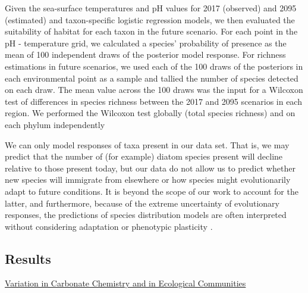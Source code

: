 \documentclass[11pt]{article}
\begin{document}
\begin{linenumbers}
Given the sea-surface temperatures and pH values for 2017 (observed) and 2095 (estimated) and taxon-specific logistic regression models, we then evaluated the suitability of habitat for each taxon in the future scenario. For each point in the pH - temperature grid, we calculated a species' probability of presence as the mean of 100 independent draws of the posterior model response. {\color{red} For richness estimations in future scenarios, we used each of the 100 draws of the posteriors in each environmental point as a sample and tallied the number of species detected on each draw. The mean value across the 100 draws was the input for a Wilcoxon test of differences in species richness between the 2017 and 2095 scenarios in each region. We performed the Wilcoxon test globally (total species richness) and on each phylum independently } 

We can only model responses of taxa present in our data set. That is, we may predict that the number of (for example) diatom species present will decline relative to those present today, but our data do not allow us to predict whether new species will immigrate from elsewhere or how species might evolutionarily adapt to future conditions. It is beyond the scope of our work to account for the latter, and furthermore, because of the extreme uncertainty of evolutionary responses, the predictions of species distribution models are often interpreted without considering adaptation or phenotypic plasticity \cite{moore2015present}. 



\subsection*{Results}
\underline{Variation in Carbonate Chemistry and in Ecological Communities}



\end{linenumbers}
\end{document}
